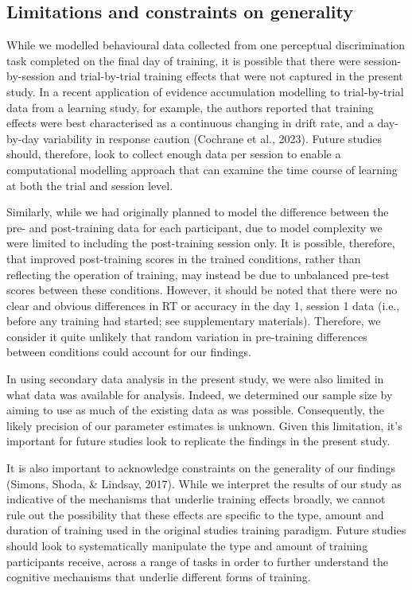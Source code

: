 \documentclass[
  man, donotrepeattitle,floatsintext]{apa6}
\begin{document}
\subsection{Limitations and constraints on generality}\label{limitations-and-constraints-on-generality}

While we modelled behavioural data collected from one perceptual discrimination task completed on the final day of training, it is possible that there were session-by-session and trial-by-trial training effects that were not captured in the present study. In a recent application of evidence accumulation modelling to trial-by-trial data from a learning study, for example, the authors reported that training effects were best characterised as a continuous changing in drift rate, and a day-by-day variability in response caution (Cochrane et al., 2023). Future studies should, therefore, look to collect enough data per session to enable a computational modelling approach that can examine the time course of learning at both the trial and session level.

Similarly, while we had originally planned to model the difference between the pre- and post-training data for each participant, due to model complexity we were limited to including the post-training session only. It is possible, therefore, that improved post-training scores in the trained conditions, rather than reflecting the operation of training, may instead be due to unbalanced pre-test scores between these conditions. However, it should be noted that there were no clear and obvious differences in RT or accuracy in the day 1, session 1 data (i.e., before any training had started; see supplementary materials). Therefore, we consider it quite unlikely that random variation in pre-training differences between conditions could account for our findings.

In using secondary data analysis in the present study, we were also limited in what data was available for analysis. Indeed, we determined our sample size by aiming to use as much of the existing data as was possible. Consequently, the likely precision of our parameter estimates is unknown. Given this limitation, it's important for future studies look to replicate the findings in the present study.

It is also important to acknowledge constraints on the generality of our findings (Simons, Shoda, \& Lindsay, 2017). While we interpret the results of our study as indicative of the mechanisms that underlie training effects broadly, we cannot rule out the possibility that these effects are specific to the type, amount and duration of training used in the original studies training paradigm. Future studies should look to systematically manipulate the type and amount of training participants receive, across a range of tasks in order to further understand the cognitive mechanisms that underlie different forms of training.
\end{document}
